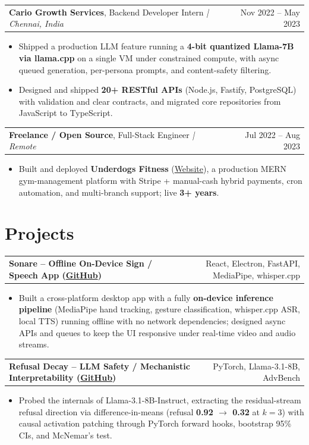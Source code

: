 \documentclass[letterpaper,11pt]{article}
\makeatletter
\newcommand{\expItem}[4]{%
  \vspace{3pt}
  \begin{tabular*}{\textwidth}{@{}l@{\extracolsep{\fill}}r@{}}
    \textbf{#1}, #2 \textit{| #3} & #4 \\
  \end{tabular*}\par\vspace{-2pt}
}
\newcommand{\projItem}[2]{%
  \vspace{6pt}
  \begin{tabular*}{\textwidth}{@{}l@{\extracolsep{\fill}}r@{}}
    \textbf{#1} & #2 \\
  \end{tabular*}\par\vspace{-2pt}
}
\makeatother
\begin{document}
\expItem{Cario Growth Services}{Backend Developer Intern}{Chennai, India}{Nov 2022 -- May 2023}
\begin{itemize}
  \item Shipped a production LLM feature running a \textbf{4-bit quantized Llama-7B via llama.cpp} on a single VM under constrained compute, with async queued generation, per-persona prompts, and content-safety filtering.
  \item Designed and shipped \textbf{20+ RESTful APIs} (Node.js, Fastify, PostgreSQL) with validation and clear contracts, and migrated core repositories from JavaScript to TypeScript.
\end{itemize}

\expItem{Freelance / Open Source}{Full-Stack Engineer}{Remote}{Jul 2022 -- Aug 2023}
\begin{itemize}
  \item Built and deployed \textbf{Underdogs Fitness} (\href{https://www.underdogsfitness.in/}{Website}), a production MERN gym-management platform with Stripe + manual-cash hybrid payments, cron automation, and multi-branch support; live \textbf{3+ years}.
\end{itemize}

\section{Projects}

\projItem{Sonare -- Offline On-Device Sign / Speech App {\normalfont\small(\href{https://github.com/Deva-1903/Qualcomm-Sep25-Team-Sonare}{GitHub})}}{React, Electron, FastAPI, MediaPipe, whisper.cpp}
\begin{itemize}
  \item Built a cross-platform desktop app with a fully \textbf{on-device inference pipeline} (MediaPipe hand tracking, gesture classification, whisper.cpp ASR, local TTS) running offline with no network dependencies; designed async APIs and queues to keep the UI responsive under real-time video and audio streams.
\end{itemize}

\projItem{Refusal Decay -- LLM Safety / Mechanistic Interpretability {\normalfont\small(\href{https://github.com/Deva-1903/refusal-decay}{GitHub})}}{PyTorch, Llama-3.1-8B, AdvBench}
\begin{itemize}
  \item Probed the internals of Llama-3.1-8B-Instruct, extracting the residual-stream refusal direction via difference-in-means (refusal \textbf{0.92 $\to$ 0.32} at $k{=}3$) with causal activation patching through PyTorch forward hooks, bootstrap 95\% CIs, and McNemar's test.
\end{itemize}
\end{document}
